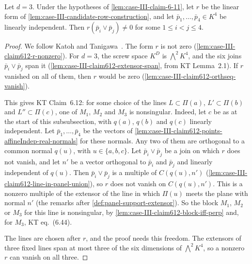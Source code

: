 \begin{lemma}
  \label{lem:case-III-claim612}
  \leanok
  Let $d = 3$. Under the hypotheses of \cref{lem:case-III-claim-6-11},
  let $r$ be the linear form of
  \cref{lem:case-III-candidate-row-construction}, and let
  $\bar p_1, \dots, \bar p_4 \in K^4$ be linearly independent. Then
  $r(\bar p_i \vee \bar p_j) \neq 0$ for some $1 \le i < j \le 4$.
\end{lemma}
\begin{proof}
  \leanok
  We follow Katoh and Tanigawa~\cite[pp.~690--691]{katohTanigawa2011}.
  The form $r$ is not zero (\cref{lem:case-III-claim612-r-nonzero}). For
  $d = 3$, the screw space $K^D$ is $\bigwedge^2 K^4$, and the six joins
  $\bar p_i \vee \bar p_j$ span it
  (\cref{lem:case-III-claim612-extensor-span}, from KT Lemma~2.1). If $r$
  vanished on all of them, then $r$ would be zero
  (\cref{lem:case-III-claim612-orthseq-vanish}).

  This gives KT Claim~6.12: for some choice of the lines
  $L \subset \Pi(a)$, $L' \subset \Pi(b)$ and $L'' \subset \Pi(c)$, one
  of $M_1$, $M_2$ and $M_3$ is nonsingular. Indeed, let $c$ be as at the
  start of this subsubsection, with $q(a)$, $q(b)$ and $q(c)$ linearly
  independent. Let $\bar p_1, \dots, \bar p_4$ be the vectors of
  \cref{lem:case-III-claim612-points-affineIndep-real-normals} for these
  normals. Any two of them are orthogonal to a common normal $q(u)$, with
  $u \in \{a, b, c\}$. Let $\bar p_i \vee \bar p_j$ be a join on which
  $r$ does not vanish,
  and let $n'$ be a vector orthogonal to $\bar p_i$ and $\bar p_j$ and
  linearly independent of $q(u)$. Then $\bar p_i \vee \bar p_j$ is a
  multiple of $C(q(u), n')$
  (\cref{lem:case-III-claim612-line-in-panel-union}), so $r$ does not
  vanish on $C(q(u), n')$. This is a nonzero multiple of the extensor of
  the line in which $\Pi(u)$ meets the plane with normal $n'$ (the
  remarks after \cref{def:panel-support-extensor}). So the block $M_1$,
  $M_2$ or $M_3$ for this line is nonsingular, by
  \cref{lem:case-III-claim612-block-iff-perp} and, for $M_3$, KT
  eq.~(6.44).

  The lines are chosen after $r$, and the proof needs this freedom. The
  extensors of three fixed lines span at most three of the six dimensions
  of $\bigwedge^2 K^4$, so a nonzero $r$ can vanish on all three.
\end{proof}

